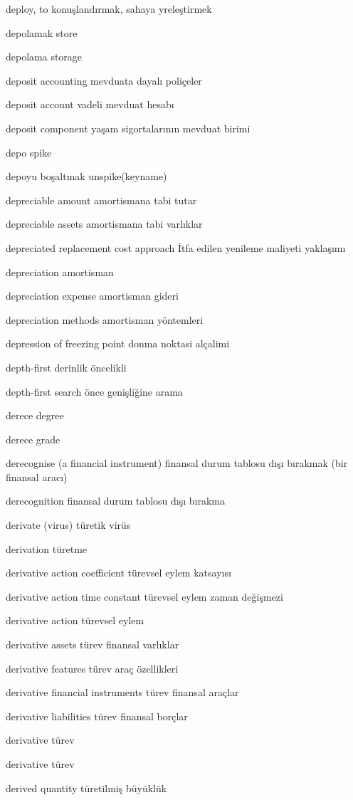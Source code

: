 \documentclass[12pt,fleqn]{article}\usepackage{../../common}
\begin{document}
deploy, to konuşlandırmak, sahaya yreleştirmek

depolamak store

depolama storage

deposit accounting mevduata dayalı poliçeler

deposit account vadeli mevduat hesabı

deposit component yaşam sigortalarının mevduat birimi

depo spike

depoyu boşaltmak unspike(keyname)

depreciable amount amortismana tabi tutar

depreciable assets amortismana tabi varlıklar

depreciated replacement cost approach İtfa edilen yenileme maliyeti yaklaşımı

depreciation amortisman

depreciation expense amortisman gideri

depreciation methods amortisman yöntemleri

depression of freezing point donma noktasi alçalimi

depth-first derinlik öncelikli

depth-first search önce genişliğine arama

derece degree

derece grade

derecognise (a financial instrument) finansal durum tablosu dışı bırakmak (bir finansal aracı)

derecognition finansal durum tablosu dışı bırakma

derivate (virus) türetik virüs

derivation türetme

derivative action coefficient türevsel eylem katsayısı

derivative action time constant türevsel eylem zaman değişmezi

derivative action türevsel eylem

derivative assets türev finansal varlıklar

derivative features türev araç özellikleri

derivative financial instruments türev finansal araçlar

derivative liabilities türev finansal borçlar

derivative türev

derivative türev

derived quantity türetilmiş büyüklük
\end{document}
